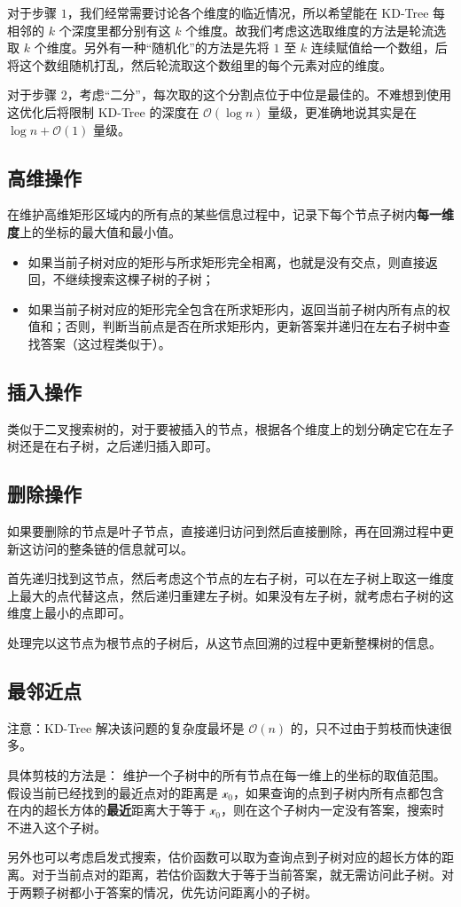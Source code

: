 对于步骤 $1$，我们经常需要讨论各个维度的临近情况，所以希望能在 KD-Tree 每相邻的 $k$ 个深度里都分别有这 $k$ 个维度。故我们考虑这选取维度的方法是轮流选取 $k$ 个维度。另外有一种“随机化”的方法是先将 $1$ 至 $k$ 连续赋值给一个数组，后将这个数组随机打乱，然后轮流取这个数组里的每个元素对应的维度。

对于步骤 $2$，考虑“二分”，每次取的这个分割点位于中位是最佳的。不难想到使用这优化后将限制 KD-Tree 的深度在 $\mathcal O\left(\log n\right)$ 量级，更准确地说其实是在 $\log n + \mathcal O(1)$ 量级。

\subsection{高维操作}

在维护高维矩形区域内的所有点的某些信息过程中，记录下每个节点子树内\textbf{每一维度}上的坐标的最大值和最小值。

\begin{itemize}
\item 如果当前子树对应的矩形与所求矩形完全相离，也就是没有交点，则直接返回，不继续搜索这棵子树的子树；

\item 如果当前子树对应的矩形完全包含在所求矩形内，返回当前子树内所有点的权值和；否则，判断当前点是否在所求矩形内，更新答案并递归在左右子树中查找答案（这过程类似于）。
\end{itemize}

\subsection{插入操作}

类似于二叉搜索树的，对于要被插入的节点，根据各个维度上的划分确定它在左子树还是在右子树，之后递归插入即可。

\subsection{删除操作}
如果要删除的节点是叶子节点，直接递归访问到然后直接删除，再在回溯过程中更新这访问的整条链的信息就可以。

首先递归找到这节点，然后考虑这个节点的左右子树，可以在左子树上取这一维度上最大的点代替这点，然后递归重建左子树。如果没有左子树，就考虑右子树的这维度上最小的点即可。

处理完以这节点为根节点的子树后，从这节点回溯的过程中更新整棵树的信息。


\subsection{最邻近点}
注意：KD-Tree 解决该问题的复杂度最坏是 $\mathcal O(n)$ 的，只不过由于剪枝而快速很多。

具体剪枝的方法是：
维护一个子树中的所有节点在每一维上的坐标的取值范围。假设当前已经找到的最近点对的距离是 $\mathscr x_0$，如果查询的点到子树内所有点都包含在内的超长方体的\textbf{最近}距离大于等于 $\mathscr x_0$，则在这个子树内一定没有答案，搜索时不进入这个子树。

另外也可以考虑启发式搜索，估价函数可以取为查询点到子树对应的超长方体的距离。对于当前点对的距离，若估价函数大于等于当前答案，就无需访问此子树。对于两颗子树都小于答案的情况，优先访问距离小的子树。


